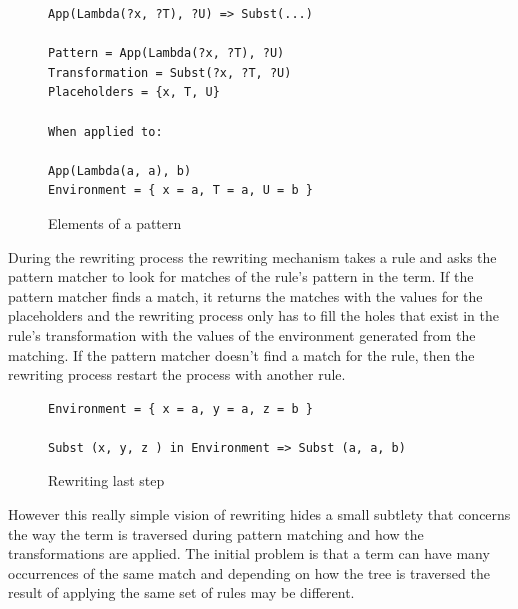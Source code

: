 \documentclass[12pt,a4paper]{article}
\begin{document}
\begin{figure}
\begin{verbatim}
App(Lambda(?x, ?T), ?U) => Subst(...)

Pattern = App(Lambda(?x, ?T), ?U)
Transformation = Subst(?x, ?T, ?U)
Placeholders = {x, T, U}

When applied to:

App(Lambda(a, a), b)
Environment = { x = a, T = a, U = b }

\end{verbatim}
\caption{Elements of a pattern}
\end{figure}


During the rewriting process the rewriting mechanism takes a rule and 
asks the pattern matcher to look for matches of the rule's pattern in the term. 
If the pattern matcher finds a match, it
returns the matches with the values for the placeholders and
the rewriting process only has to fill the holes that exist in the rule's
transformation with the values of the environment generated from the matching. If the
pattern matcher doesn't find a match for the rule, then the rewriting process restart
the process with another rule.



\begin{figure}
\begin{verbatim}
Environment = { x = a, y = a, z = b }

Subst (x, y, z ) in Environment => Subst (a, a, b) 

\end{verbatim}
\caption{Rewriting last step}
\end{figure}

However this really simple vision of rewriting hides a small subtlety
that concerns the way the term is traversed during pattern matching
and how the transformations are applied. The initial problem is that
a term can have many occurrences of the same match and depending on
how the tree is traversed the result of applying the same set of rules
may be different.
\end{document}

